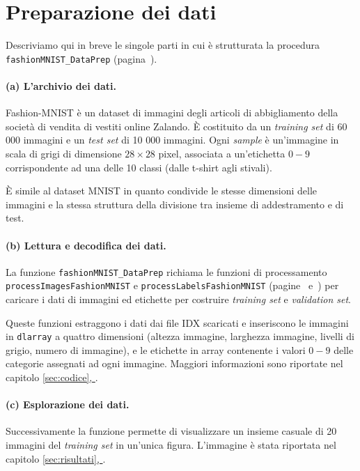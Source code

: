 \documentclass[a4paper,12pt]{article}
\renewcommand*{\fullref}[1]{\hyperref[{#1}]{\vref*{#1}, \emph{\nameref*{#1}}}}
\begin{document}
\newpage
\section{Preparazione dei dati} %
\label{sec:preparazione}

Descriviamo qui in breve le singole parti in cui è strutturata la procedura \texttt{fashionMNIST\-\_\-Da\-ta\-Prep} (pagina~\pageref{lst:dataprep}).

\paragraph{(a) L'archivio dei dati.}
Fashion-MNIST è un dataset di immagini degli articoli di abbigliamento della società di vendita di vestiti online Zalando. È costituito da un \emph{training set} di 60 000 immagini e un \emph{test set} di 10 000 immagini. Ogni \emph{sample} è un'immagine in scala di grigi di dimensione $28\times28$ pixel, associata a un'etichetta $0-9$ corrispondente ad una delle 10 classi (dalle t-shirt agli stivali). 

È simile al dataset MNIST in quanto condivide le stesse dimensioni delle immagini e la stessa struttura della divisione tra insieme di addestramento e di test.


\paragraph{(b) Lettura e decodifica dei dati.}
La funzione \texttt{fashionMNIST\-\_\-Da\-ta\-Prep} richiama le funzioni di processamento \texttt{processImagesFashionMNIST} e \texttt{processLabelsFashionMNIST} (pagine~\pageref{lst:processimages} e~\pageref{lst:processlabels}) per caricare i dati di immagini ed etichette per costruire \emph{training set} e \emph{validation set}. 

Queste funzioni estraggono i dati dai file IDX scaricati e inseriscono le immagini in \texttt{dlarray} a quattro dimensioni (altezza immagine, larghezza immagine, livelli di grigio, numero di immagine), e le etichette in array contenente i valori $0-9$ delle categorie assegnati ad ogni immagine. Maggiori informazioni sono riportate nel capitolo \fullref{sec:codice}.

\paragraph{(c) Esplorazione dei dati.}
Successivamente la funzione permette di visualizzare un insieme casuale di 20 immagini del \emph{training set} in un'unica figura. L'immagine è stata riportata nel capitolo \fullref{sec:risultati}.
\end{document}
